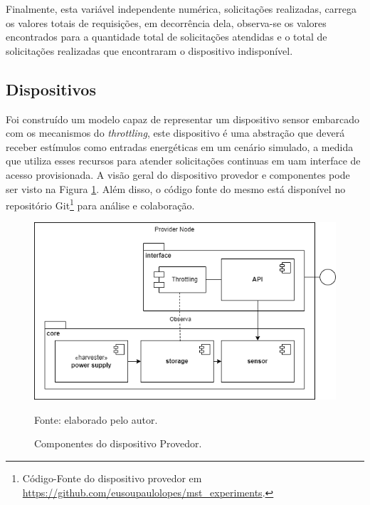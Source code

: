Finalmente, esta variável independente numérica, solicitações realizadas, carrega os valores totais de requisições, em decorrência dela, observa-se os valores encontrados para a quantidade total de solicitações atendidas e o total de solicitações realizadas que encontraram o dispositivo indisponível. 


\subsection{Dispositivos}

Foi construído um modelo capaz de representar um dispositivo sensor embarcado com os mecanismos do \textit{throttling}, este dispositivo é uma abstração que deverá receber estímulos como entradas energéticas em um cenário simulado, a medida que utiliza esses recursos para atender solicitações continuas em uam interface de acesso provisionada. A visão geral do dispositivo provedor e componentes pode ser visto na Figura \ref{fig:cap6providernode}. Além disso, o código fonte do mesmo está disponível no repositório Git\footnote{Código-Fonte do dispositivo provedor em \url{https://github.com/eusoupaulolopes/mst_experiments}.}  para análise e colaboração.

\begin{figure}[H]
	\centering
	
	\caption{Componentes do dispositivo Provedor.}
	\label{fig:cap6providernode}
	\noindent\includegraphics[width=0.75\linewidth]{Imagens/cap6/cap6providernode.png} 
	
	Fonte: elaborado pelo autor.
\end{figure}

